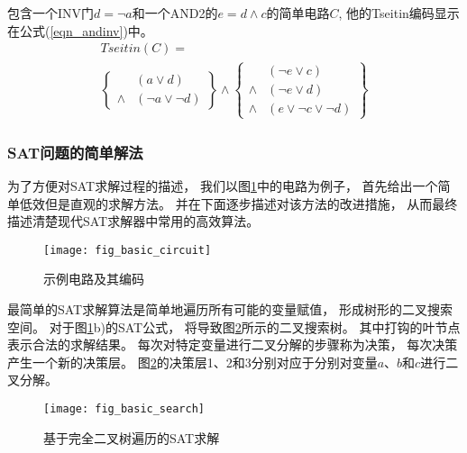 包含一个INV门$d=\neg a$和一个AND2的$e=d\wedge c$的简单电路$C$,
他的Tseitin编码显示在公式(\ref{eqn_andinv})中。
\begin{multline}\label{eqn_andinv}
Tseitin(C)=\\
\left\{
\begin{array}{cc}
& (a\vee d) \\
\wedge & (\neg a\vee \neg d)
\end{array}
\right\}\wedge\left\{
\begin{array}{cc}
& (\neg e\vee c) \\
\wedge & (\neg e\vee d) \\
\wedge & (e\vee \neg c\vee\neg d)
\end{array}
\right\}
\end{multline}



\subsubsection{SAT问题的简单解法}
为了方便对SAT求解过程的描述，
我们以图\ref{basic_circuit}中的电路为例子，
首先给出一个简单低效但是直观的求解方法。
并在下面逐步描述对该方法的改进措施，
从而最终描述清楚现代SAT求解器中常用的高效算法。

\begin{figure}[t] %
  \centering
  \texttt{[image: fig\_basic\_circuit]}
  \caption{示例电路及其编码}
  \label{basic_circuit}
\end{figure}


最简单的SAT求解算法是简单地遍历所有可能的变量赋值，
形成树形的二叉搜索空间。
对于图\ref{basic_circuit}b)的SAT公式，
将导致图\ref{basic_search}所示的二叉搜索树。
其中打钩的叶节点表示合法的求解结果。
每次对特定变量进行二叉分解的步骤称为决策，
每次决策产生一个新的决策层。
图\ref{basic_search}的决策层1、2和3分别对应于分别对变量$a$、$b$和$c$进行二叉分解。

\begin{figure}[t] %
  \centering
  \texttt{[image: fig\_basic\_search]}
  \caption{基于完全二叉树遍历的SAT求解}
  \label{basic_search}
\end{figure}

